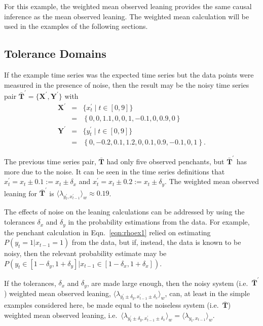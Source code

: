 \documentclass[a4paper,11pt,twocolumn]{article}
\begin{document}
For this example, the weighted mean observed leaning provides the same causal inference as the mean observed leaning.  The weighted mean calculation will be used in the examples of the following sections.

\subsection{Tolerance Domains}
\label{sec:tol}
If the example time series was the expected time series but the data points were measured in the presence of noise, then the result may be the noisy time series pair $\bar{\mathbf{T}}^\prime=\{\mathbf{X}^\prime,\mathbf{Y}^\prime\}$ with
\begin{eqnarray*}
\mathbf{X}^\prime &=& \{x_t^\prime\; | \; t\in[0,9]\}\\
&=& \left\{0,0,1.1,0,0,1,-0.1,0,0.9,0\right\}\\
\mathbf{Y}^\prime &=& \{y_t^\prime\; | \; t\in[0,9]\}\\
&=& \left\{0,-0.2,0.1,1.2,0,0.1,0.9,-0.1,0,1\right\}.
\end{eqnarray*}

The previous time series pair, $\bar{\mathbf{T}}$ had only five observed penchants, but $\bar{\mathbf{T}}^\prime$ has more due to the noise.  It can be seen in the time series definitions that $x_t^\prime = x_t \pm 0.1 := x_t \pm \delta_x$ and $x_t^\prime = x_t \pm 0.2 := x_t \pm \delta_y$.  The weighted mean observed leaning for $\bar{\mathbf{T}}^\prime$ is $\langle \lambda_{y_t^\prime,x_{t-1}^\prime} \rangle_w \approx 0.19$. 

The effects of noise on the leaning calculations can be addressed by using the tolerances $\delta_x$ and $\delta_y$ in the probability estimations from the data.  For example, the penchant calculation in Eqn.\ \ref{eqn:rhoex1} relied on estimating $P(y_t=1|x_{t-1}=1)$ from the data, but if, instead, the data is known to be noisy, then the relevant probability estimate may be $P(y_t\in[1-\delta_y,1+\delta_y]|x_{t-1}\in[1-\delta_x,1+\delta_x])$.  

If the tolerances, $\delta_x$ and $\delta_y$, are made large enough, then the noisy system (i.e.\ $\bar{\mathbf{T}}^\prime$) weighted mean observed leaning, $\langle \lambda_{y_t^\prime\pm\delta_y,x_{t-1}^\prime\pm\delta_x} \rangle_w$, can, at least in the simple examples considered here, be made equal to the noiseless system (i.e.\ $\bar{\mathbf{T}}$) weighted mean observed leaning, i.e.\ $\langle \lambda_{y_t^\prime\pm\delta_y,x_{t-1}^\prime\pm\delta_x} \rangle_w = \langle \lambda_{y_t,x_{t-1}} \rangle_w$.
\end{document}
